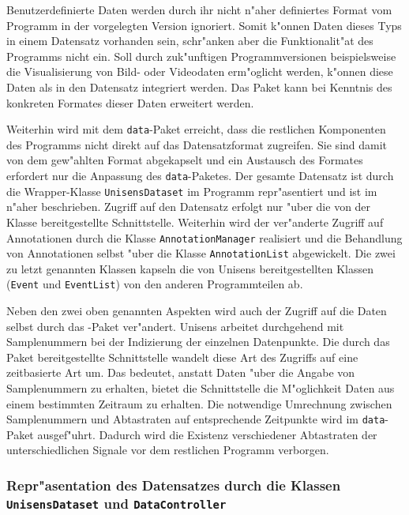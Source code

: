 Benutzerdefinierte Daten werden durch ihr nicht n"aher definiertes Format vom Programm in der vorgelegten Version ignoriert.
Somit k"onnen Daten dieses Typs in einem Datensatz vorhanden sein, schr"anken aber die Funktionalit"at des Programms nicht ein.
Soll durch zuk"unftigen Programmversionen beispielsweise die Visualisierung von Bild- oder Videodaten erm"oglicht werden, k"onnen diese Daten als  in den Datensatz integriert werden.
Das Paket  kann bei Kenntnis des konkreten Formates dieser Daten erweitert werden.

Weiterhin wird mit dem \verb|data|-Paket erreicht, dass die restlichen Komponenten des Programms nicht direkt auf das Datensatzformat zugreifen.
Sie sind damit von dem gew"ahlten Format abgekapselt und ein Austausch des Formates erfordert nur die Anpassung des \verb|data|-Paketes.
Der gesamte Datensatz ist durch die Wrapper-Klasse \verb|UnisensDataset| im Programm repr"asentiert und ist im  n"aher beschrieben.
Zugriff auf den Datensatz erfolgt nur "uber die von der Klasse bereitgestellte Schnittstelle.
Weiterhin wird der ver"anderte Zugriff auf Annotationen durch die Klasse \verb|AnnotationManager| realisiert und die Behandlung von Annotationen selbst "uber die Klasse \verb|AnnotationList| abgewickelt.
Die zwei zu letzt genannten Klassen kapseln die von Unisens bereitgestellten Klassen (\verb|Event| und \verb|EventList|) von den anderen Programmteilen ab.

Neben den zwei oben genannten Aspekten wird auch der Zugriff auf die Daten selbst durch das -Paket ver"andert.
Unisens arbeitet durchgehend mit Samplenummern bei der Indizierung der einzelnen Datenpunkte.
Die durch das Paket bereitgestellte Schnittstelle wandelt diese Art des Zugriffs auf eine zeitbasierte Art um.
Das bedeutet, anstatt Daten "uber die Angabe von Samplenummern zu erhalten, bietet die Schnittstelle die M"oglichkeit Daten aus einem bestimmten Zeitraum zu erhalten.
Die notwendige Umrechnung zwischen Samplenummern und Abtastraten auf entsprechende Zeitpunkte wird im \verb|data|-Paket ausgef"uhrt.
Dadurch wird die Existenz verschiedener Abtastraten der unterschiedlichen Signale vor dem restlichen Programm verborgen.

\subsubsection{Repr"asentation des Datensatzes durch die Klassen \texttt{Unisens\-Dataset} und \texttt{DataController}}
\label{sec:datensatz_repraesentation}

